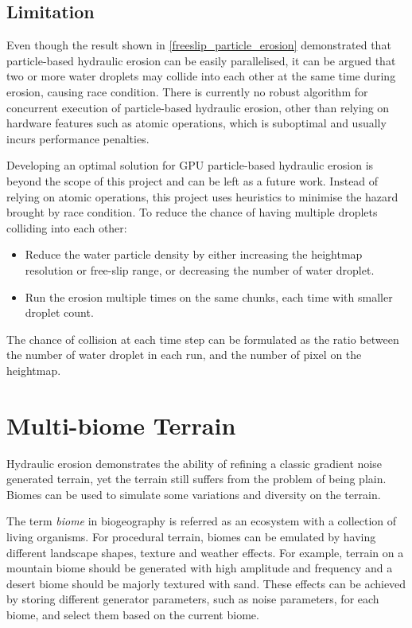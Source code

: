 \documentclass[oneside, a4paper]{report}
\begin{document}
    \subsection{Limitation}

    Even though the result shown in \ref{freeslip_particle_erosion} demonstrated that particle-based hydraulic erosion can be easily parallelised, it can be argued that two or more water droplets may collide into each other at the same time during erosion, causing race condition. There is currently no robust algorithm for concurrent execution of particle-based hydraulic erosion, other than relying on hardware features such as atomic operations, which is suboptimal and usually incurs performance penalties.

    Developing an optimal solution for GPU particle-based hydraulic erosion is beyond the scope of this project and can be left as a future work. Instead of relying on atomic operations, this project uses heuristics to minimise the hazard brought by race condition. To reduce the chance of having multiple droplets colliding into each other:

    \begin{itemize}[label=\(\diamond\)]
        \item Reduce the water particle density by either increasing the heightmap resolution or free-slip range, or decreasing the number of water droplet.
        \item Run the erosion multiple times on the same chunks, each time with smaller droplet count.
    \end{itemize}

    The chance of collision at each time step can be formulated as the ratio between the number of water droplet in each run, and the number of pixel on the heightmap.

    \section{Multi-biome Terrain}

    Hydraulic erosion demonstrates the ability of refining a classic gradient noise generated terrain, yet the terrain still suffers from the problem of being plain. Biomes can be used to simulate some variations and diversity on the terrain.

    The term \textit{biome} in biogeography is referred as an ecosystem with a collection of living organisms. For procedural terrain, biomes can be emulated by having different landscape shapes, texture and weather effects. For example, terrain on a mountain biome should be generated with high amplitude and frequency and a desert biome should be majorly textured with sand. These effects can be achieved by storing different generator parameters, such as noise parameters, for each biome, and select them based on the current biome.
\end{document}

